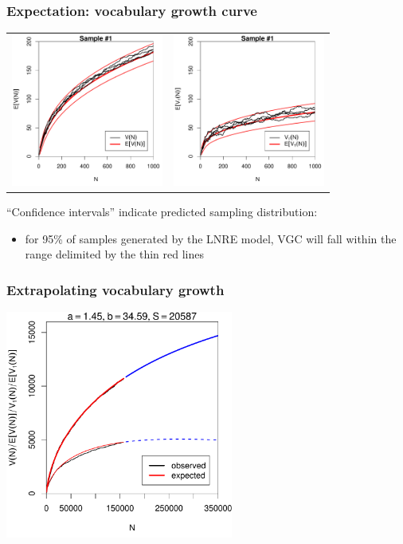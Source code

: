 \documentclass[t]{beamer} %
\begin{document}
\begin{frame}
  \frametitle{Expectation: vocabulary growth curve}

  \ungap[1]
  \begin{center}
    \begin{tabular}{c @{} c}
      \includegraphics[width=50mm]{img/05-samples-vgc-exp-vs-samples-conf} &
      \includegraphics[width=50mm]{img/05-samples-vgc-V1-exp-vs-samples-conf}
    \end{tabular}
  \end{center}

  ``Confidence intervals'' indicate predicted sampling distribution:%
  \begin{itemize}
  \item[\hand] for 95\% of samples generated by the LNRE model, VGC will fall within the range delimited by the thin red lines
  \end{itemize}
\end{frame}

\begin{frame}[c]
  \frametitle{Extrapolating vocabulary growth}
  
  \centering
  \includegraphics[width=7.5cm]{img/02-samples-ot-vgc-extrapolated}
\end{frame}
\end{document}
